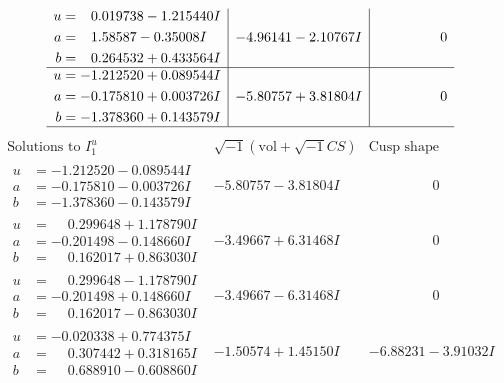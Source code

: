 \documentclass[1p]{elsarticle_modified}
\theoremstyle{definition}
\newcommand{\I}{\sqrt{-1}}
\begin{document}
$$\begin{array}{c|c|c}
\begin{aligned}
u &= \phantom{-}0.019738 - 1.215440 I \\
a &= \phantom{-}1.58587 - 0.35008 I \\
b &= \phantom{-}0.264532 + 0.433564 I\end{aligned}
 & -4.96141 - 2.10767 I & \phantom{-0.000000 } 0 \\ \hline\begin{aligned}
u &= -1.212520 + 0.089544 I \\
a &= -0.175810 + 0.003726 I \\
b &= -1.378360 + 0.143579 I\end{aligned}
 & -5.80757 + 3.81804 I & \phantom{-0.000000 } 0\\
 \hline 
 \end{array}$$\newpage$$\begin{array}{c|c|c}  
\text{Solutions to }I^u_{1}& \I (\text{vol} + \sqrt{-1}CS) & \text{Cusp shape}\\
 \hline 
\begin{aligned}
u &= -1.212520 - 0.089544 I \\
a &= -0.175810 - 0.003726 I \\
b &= -1.378360 - 0.143579 I\end{aligned}
 & -5.80757 - 3.81804 I & \phantom{-0.000000 } 0 \\ \hline\begin{aligned}
u &= \phantom{-}0.299648 + 1.178790 I \\
a &= -0.201498 - 0.148660 I \\
b &= \phantom{-}0.162017 + 0.863030 I\end{aligned}
 & -3.49667 + 6.31468 I & \phantom{-0.000000 } 0 \\ \hline\begin{aligned}
u &= \phantom{-}0.299648 - 1.178790 I \\
a &= -0.201498 + 0.148660 I \\
b &= \phantom{-}0.162017 - 0.863030 I\end{aligned}
 & -3.49667 - 6.31468 I & \phantom{-0.000000 } 0 \\ \hline\begin{aligned}
u &= -0.020338 + 0.774375 I \\
a &= \phantom{-}0.307442 + 0.318165 I \\
b &= \phantom{-}0.688910 - 0.608860 I\end{aligned}
 & -1.50574 + 1.45150 I & -6.88231 - 3.91032 I \\ \hline\begin{aligned}

\end{aligned}
\end{array}$$
\end{document}
